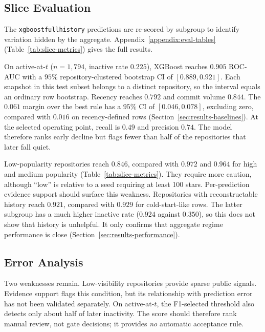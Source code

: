 \subsection{Slice Evaluation}
\label{sec:results-slices}

The \texttt{xgboost\sdash full\sdash history} predictions are re-scored by
subgroup to identify variation hidden by the aggregate.
Appendix~\ref{appendix:eval-tables}
(Table~\ref{tab:slice-metrics}) gives the full results.

On active-at-\(t\) (\(n=1{,}794\), inactive rate \(0.225\)), XGBoost reaches
\(0.905\) ROC-AUC with a \(95\%\) repository-clustered bootstrap CI of
\([0.889, 0.921]\). Each snapshot in this test subset belongs to a distinct
repository, so the interval equals an ordinary row bootstrap. Recency reaches
\(0.792\) and commit volume \(0.844\). The \(0.061\) margin over the best rule
has a \(95\%\) CI of \([0.046, 0.078]\), excluding zero, compared with \(0.016\)
on recency-defined rows (Section~\ref{sec:results-baselines}). At the selected
operating point, recall is \(0.49\) and precision \(0.74\). The model therefore
ranks early decline but flags fewer than half of the repositories that later fall
quiet.

Low-popularity repositories reach \(0.846\), compared with \(0.972\) and
\(0.964\) for high and medium popularity (Table~\ref{tab:slice-metrics}). They
require more caution, although ``low'' is relative to a seed requiring at least
100 stars. Per-prediction evidence support should surface this weakness.
Repositories with reconstructable history reach \(0.921\), compared with
\(0.929\) for cold-start-like rows. The latter subgroup has a much higher
inactive rate (\(0.924\) against \(0.350\)), so this does not show that history
is unhelpful. It only confirms that aggregate regime performance is close
(Section~\ref{sec:results-performance}).

\subsection{Error Analysis}
\label{sec:results-error-analysis}

Two weaknesses remain. Low-visibility repositories provide sparse public
signals. Evidence support flags this condition, but its relationship with
prediction error has not been validated separately. On active-at-\(t\), the
F1-selected threshold also detects only about half of later inactivity. The score
should therefore rank manual review, not gate decisions; it provides \emph{no}
automatic acceptance rule.

